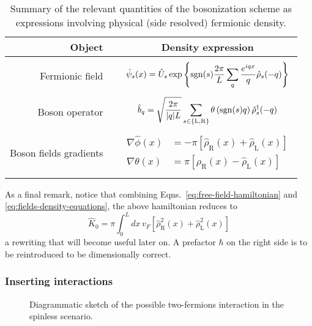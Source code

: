 \begin{table}
	\centering
	\begin{tabular}{r c c}
		\toprule
		Object && Density expression\\
		\midrule
		&& \\
		Fermionic field && $\displaystyle \hat \psi_s (x) = \hat U_s \exp\left\{ \mathrm{sgn}(s) \frac{2\pi}{L} \sum_q \frac{e^{iqx}}{q} \hat \rho_s (-q) \right\}$ \\
		&&\\
		Boson operator && $\displaystyle \hat b_q = \sqrt{\frac{2\pi}{\abs{q}L}} \sum_{s \in \left\{\mathrm L, \mathrm R\right\}} \theta \left(\mathrm{sgn}(s) q\right) \hat \rho_s^\dagger (-q)$ \\
		&&\\ 
		Boson fields gradients && $\displaystyle \begin{aligned}
			\nabla \hat \phi(x) &= - \pi \left[ \hat \rho_\mathrm{R}(x) + \hat \rho_\mathrm{L}(x) \right] \\ 
			\nabla \hat \theta(x) &= \pi \left[ \hat \rho_\mathrm{R}(x) - \hat \rho_\mathrm{L}(x) \right]
		\end{aligned}$ \\
		&& \\
		\bottomrule
	\end{tabular}
	\caption{Summary of the relevant quantities of the bosonization scheme as expressions involving physical (side resolved) fermionic density.}
	\label{tab:bosonization-formulas}
\end{table}

As a final remark, notice that combining Eqns.~\eqref{eq:free-field-hamiltonian} and \eqref{eq:fields-density-equations}, the above hamiltonian reduces to
\begin{equation}\label{eq:free-field-hamiltonian-density-integral}
	\hat K_0 = \pi \int_0^L dx \, v_F \left[  
		\hat \rho_\mathrm{R}^2 (x) + \hat \rho_\mathrm{L}^2 (x)
	\right]
\end{equation}
a rewriting that will become useful later on. A prefactor $\hbar$ on the right side is to be reintroduced to be dimensionally correct.

\subsubsection{Inserting interactions}

\begin{figure}
	\centering
	\subfloat[][$g_1 = V(q \approx \pm 2k_F)$ process.]{
		
		\label{fig:g1-process}
	}
	\subfloat[][$g_2 = V(q \approx 0)$ process.]{
		
		\label{fig:g2-process}
	}
	\subfloat[][$g_4 = V(q \approx 0)$ process.]{
		
		\label{fig:g4-process}
	}
	\caption{Diagrammatic sketch of the possible two-fermions interaction in the spinless scenario.}
	\label{fig:g-processes}
\end{figure}

